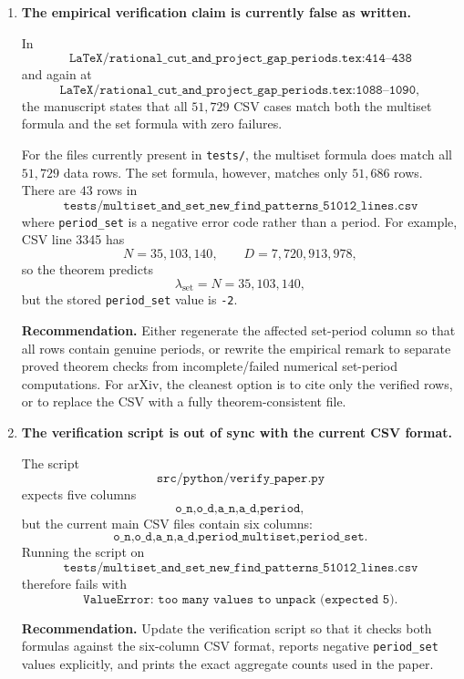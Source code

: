 \documentclass[11pt]{article}
\begin{document}
\begin{enumerate}[label=\textbf{F\arabic*.},leftmargin=*]

\item \textbf{The empirical verification claim is currently false as written.}

In
\[
\texttt{LaTeX/rational\_cut\_and\_project\_gap\_periods.tex:414--438}
\]
and again at
\[
\texttt{LaTeX/rational\_cut\_and\_project\_gap\_periods.tex:1088--1090},
\]
the manuscript states that all \(51{,}729\) CSV cases match both the multiset
formula and the set formula with zero failures.

For the files currently present in \texttt{tests/}, the multiset formula does
match all \(51{,}729\) data rows.  The set formula, however, matches only
\(51{,}686\) rows.  There are \(43\) rows in
\[
\texttt{tests/multiset\_and\_set\_new\_find\_patterns\_51012\_lines.csv}
\]
where \texttt{period\_set} is a negative error code rather than a period.
For example, CSV line 3345 has
\[
  N=35{,}103{,}140,\qquad D=7{,}720{,}913{,}978,
\]
so the theorem predicts
\[
  \lambda_{\mathrm{set}} = N = 35{,}103{,}140,
\]
but the stored \texttt{period\_set} value is \texttt{-2}.

\textbf{Recommendation.}  Either regenerate the affected set-period column
so that all rows contain genuine periods, or rewrite the empirical remark to
separate proved theorem checks from incomplete/failed numerical set-period
computations.  For arXiv, the cleanest option is to cite only the verified
rows, or to replace the CSV with a fully theorem-consistent file.

\item \textbf{The verification script is out of sync with the current CSV
format.}

The script
\[
\texttt{src/python/verify\_paper.py}
\]
expects five columns
\[
\texttt{o\_n,o\_d,a\_n,a\_d,period},
\]
but the current main CSV files contain six columns:
\[
\texttt{o\_n,o\_d,a\_n,a\_d,period\_multiset,period\_set}.
\]
Running the script on
\[
\texttt{tests/multiset\_and\_set\_new\_find\_patterns\_51012\_lines.csv}
\]
therefore fails with
\[
\texttt{ValueError: too many values to unpack (expected 5)}.
\]

\textbf{Recommendation.}  Update the verification script so that it checks
both formulas against the six-column CSV format, reports negative
\texttt{period\_set} values explicitly, and prints the exact aggregate counts
used in the paper.

\end{enumerate}
\end{document}
